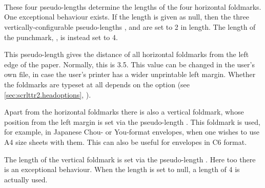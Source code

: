 \begin{Declaration}
  \\
  \\
  \\
\end{Declaration}
%
%
%
%
These four pseudo-lengths
determine the lengths of the four horizontal foldmarks. One
exceptional behaviour exists. If the length is given as null, then the
three vertically-configurable pseudo-lengths
,  and
 are set to 2 in length. The length of
the punchmark, , is instead set to 4.
%
%
%
%


\begin{Declaration}
\end{Declaration}
%
This pseudo-length gives the distance of all horizontal foldmarks from
the left edge of the paper. Normally, this is 3.5. This value
can be changed in the user's own  file, in case the user's
printer has a wider unprintable left margin. Whether the foldmarks are
typeset at all depends on the option  (see
\autoref{sec:scrlttr2.headoptions},
).
%
%
%


\begin{Declaration}
\end{Declaration}
%
Apart from the horizontal
foldmarks there is also a vertical foldmark, whose position from the
left margin is set via the pseudo-length . This
foldmark is used, for example, in Japanese Chou- or You-format
envelopes, when one wishes to use A4 size sheets with them. This can
also be useful for envelopes in C6 format.
%


\begin{Declaration}
\end{Declaration}
%
The length of the vertical
foldmark is set via the pseudo-length .  Here
too there is an exceptional behaviour. When the length is set to null,
a length of 4 is actually used.
%


